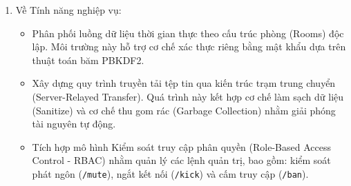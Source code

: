 \begin{enumerate}[label=\arabic*.]
    \item Về Tính năng nghiệp vụ:
    \begin{itemize}[label={-}]
        \item Phân phối luồng dữ liệu thời gian thực theo cấu trúc phòng (Rooms) độc lập. Môi trường này hỗ trợ cơ chế xác thực riêng bằng mật khẩu dựa trên thuật toán băm PBKDF2.
        \item Xây dựng quy trình truyền tải tệp tin qua kiến trúc trạm trung chuyển (Server-Relayed Transfer). Quá trình này kết hợp cơ chế làm sạch dữ liệu (Sanitize) và cơ chế thu gom rác (Garbage Collection) nhằm giải phóng tài nguyên tự động.
        \item Tích hợp mô hình Kiểm soát truy cập phân quyền (Role-Based Access Control - RBAC) nhằm quản lý các lệnh quản trị, bao gồm: kiểm soát phát ngôn (\texttt{/mute}), ngắt kết nối (\texttt{/kick}) và cấm truy cập (\texttt{/ban}).
    \end{itemize}
\end{enumerate}
